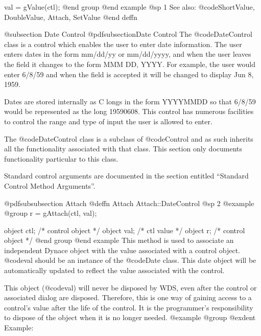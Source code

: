 val = gValue(ctl);
@end group
@end example
@sp 1
See also:  @code{ShortValue, DoubleValue, Attach, SetValue}
@end deffn









@subsection Date Control
@pdfsubsection{Date Control}
The @code{DateControl} class is a control which enables the user to
enter date information.  The user enters dates in the form mm/dd/yy
or mm/dd/yyyy, and when the user leaves the field it changes to the
form MMM DD, YYYY.  For example, the user would enter 6/8/59 and
when the field is accepted it will be changed to display Jun 8, 1959.

Dates are stored internally as C longs in the form YYYYMMDD so that
6/8/59 would be represented as the long 19590608.  This control has
numerous facilities to control the range and type of input the user is
allowed to enter.

The @code{DateControl} class is a subclass of @code{Control} and as such
inherits all the functionality associated with that class.  This section
only documents functionality particular to this class.

Standard control arguments are documented in the section entitled
``Standard Control Method Arguments''.












@pdfsubsubsection {Attach}
@deffn {Attach} Attach::DateControl
@sp 2
@example
@group
r = gAttach(ctl, val);

object  ctl;   /*  control object  */
object  val;   /*  ctl value       */
object  r;     /*  control object  */
@end group
@end example
This method is used to associate an independent Dynace object with the
value associated with a control object.  @code{val} should be an
instance of the @code{Date} class.  This date object will be
automatically updated to reflect the value associated with the control.

This object (@code{val}) will never be disposed by WDS, even after
the control or associated dialog are disposed.  Therefore, this
is one way of gaining access to a control's value after the life
of the control.  It is the programmer's responsibility to dispose of
the object when it is no longer needed.
@example
@group
@exdent Example:

